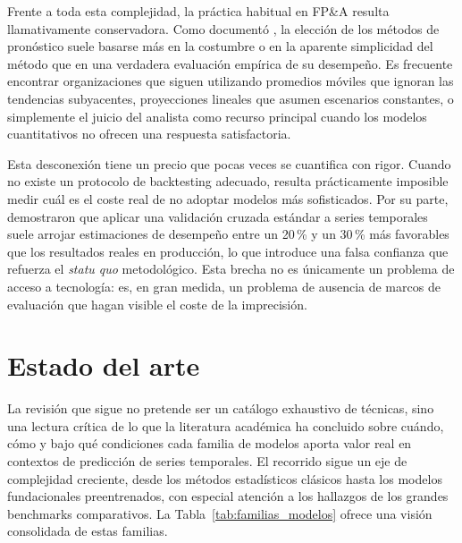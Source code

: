 Frente a toda esta complejidad, la práctica habitual en FP\&A resulta llamativamente conservadora. Como documentó \textcite{Armstrong2001}, la elección de los métodos de pronóstico suele basarse más en la costumbre o en la aparente simplicidad del método que en una verdadera evaluación empírica de su desempeño. Es frecuente encontrar organizaciones que siguen utilizando promedios móviles que ignoran las tendencias subyacentes, proyecciones lineales que asumen escenarios constantes, o simplemente el juicio del analista como recurso principal cuando los modelos cuantitativos no ofrecen una respuesta satisfactoria.

Esta desconexión tiene un precio que pocas veces se cuantifica con rigor. Cuando no existe un protocolo de backtesting adecuado, resulta prácticamente imposible medir cuál es el coste real de no adoptar modelos más sofisticados. Por su parte, \textcite{Bergmeir2012} demostraron que aplicar una validación cruzada estándar a series temporales suele arrojar estimaciones de desempeño entre un 20\,\% y un 30\,\% más favorables que los resultados reales en producción, lo que introduce una falsa confianza que refuerza el \textit{statu quo} metodológico. Esta brecha no es únicamente un problema de acceso a tecnología: es, en gran medida, un problema de ausencia de marcos de evaluación que hagan visible el coste de la imprecisión.

\section{Estado del arte}
\label{sec:estado_arte}

La revisión que sigue no pretende ser un catálogo exhaustivo de técnicas, sino una lectura crítica de lo que la literatura académica ha concluido sobre cuándo, cómo y bajo qué condiciones cada familia de modelos aporta valor real en contextos de predicción de series temporales. El recorrido sigue un eje de complejidad creciente, desde los métodos estadísticos clásicos hasta los modelos fundacionales preentrenados, con especial atención a los hallazgos de los grandes benchmarks comparativos. La Tabla~\ref{tab:familias_modelos} ofrece una visión consolidada de estas familias.

